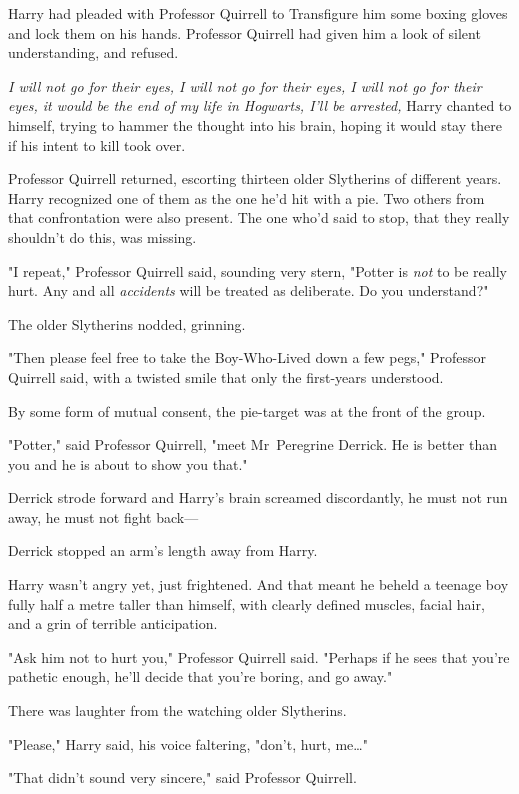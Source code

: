 Harry had pleaded with Professor Quirrell to Transfigure him some boxing gloves
and lock them on his hands. Professor Quirrell had given him a look of silent
understanding, and refused.

\emph{I will not go for their eyes, I will not go for their eyes, I will not go
for their eyes, it would be the end of my life in Hogwarts, I'll be arrested,}
Harry chanted to himself, trying to hammer the thought into his brain, hoping
it would stay there if his intent to kill took over.

Professor Quirrell returned, escorting thirteen older Slytherins of different
years. Harry recognized one of them as the one he'd hit with a pie. Two others
from that confrontation were also present. The one who'd said to stop, that
they really shouldn't do this, was missing.

"I repeat," Professor Quirrell said, sounding very stern, "Potter is \emph{not}
to be really hurt. Any and all \emph{accidents} will be treated as deliberate.
Do you understand?"

The older Slytherins nodded, grinning.

"Then please feel free to take the Boy-Who-Lived down a few pegs," Professor
Quirrell said, with a twisted smile that only the first-years understood.

By some form of mutual consent, the pie-target was at the front of the group.

"Potter," said Professor Quirrell, "meet Mr~Peregrine Derrick. He is better
than you and he is about to show you that."

Derrick strode forward and Harry's brain screamed discordantly, he must not run
away, he must not fight back---

Derrick stopped an arm's length away from Harry.

Harry wasn't angry yet, just frightened. And that meant he beheld a teenage boy
fully half a metre taller than himself, with clearly defined muscles, facial
hair, and a grin of terrible anticipation.

"Ask him not to hurt you," Professor Quirrell said. "Perhaps if he sees that
you're pathetic enough, he'll decide that you're boring, and go away."

There was laughter from the watching older Slytherins.

"Please," Harry said, his voice faltering, "don't, hurt, me{\ldots}"

"That didn't sound very sincere," said Professor Quirrell.

